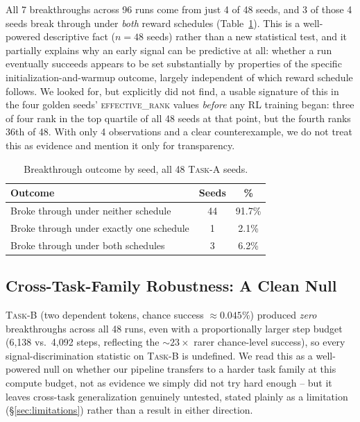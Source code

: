\documentclass{article}
\newcommand{\taskA}{\textsc{Task-A}}
\newcommand{\taskB}{\textsc{Task-B}}
\newcommand{\erank}{\textsc{effective\_rank}}
\begin{document}
All 7 breakthroughs across 96 runs come from just 4 of 48 seeds, and 3 of
those 4 seeds break through under \emph{both} reward schedules
(Table~\ref{tab:seedcluster}). This is a well-powered descriptive fact ($n=48$
seeds) rather than a new statistical test, and it partially explains why an
early signal can be predictive at all: whether a run eventually succeeds
appears to be set substantially by properties of the specific
initialization-and-warmup outcome, largely independent of which reward
schedule follows. We looked for, but explicitly did not find, a usable
signature of this in the four golden seeds' \erank{} values \emph{before} any
RL training began: three of four rank in the top quartile of all 48 seeds at
that point, but the fourth ranks 36th of 48. With only 4 observations and a
clear counterexample, we do not treat this as evidence and mention it only for
transparency.

\begin{table}[t]
\centering
\caption{Breakthrough outcome by seed, all 48 \taskA{} seeds.}
\label{tab:seedcluster}
\begin{tabular}{lcc}
\toprule
Outcome & Seeds & \% \\
\midrule
Broke through under neither schedule & 44 & 91.7\% \\
Broke through under exactly one schedule & 1 & 2.1\% \\
Broke through under both schedules & 3 & 6.2\% \\
\bottomrule
\end{tabular}
\end{table}

\subsection{Cross-Task-Family Robustness: A Clean Null}
\label{sec:crosstask}

\taskB{} (two dependent tokens, chance success $\approx 0.045\%$) produced
\emph{zero} breakthroughs across all 48 runs, even with a proportionally
larger step budget (6{,}138 vs.\ 4{,}092 steps, reflecting the
$\sim\!23\times$ rarer chance-level success), so every signal-discrimination
statistic on \taskB{} is undefined. We read this as a well-powered null on
whether our pipeline transfers to a harder task family at this compute
budget, not as evidence we simply did not try hard enough -- but it leaves
cross-task generalization genuinely untested, stated plainly as a limitation
(\S\ref{sec:limitations}) rather than a result in either direction.
\end{document}
